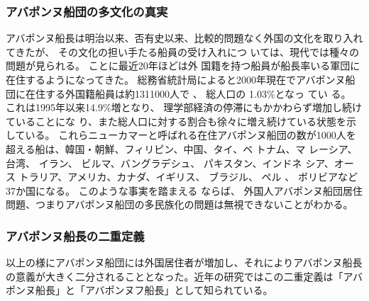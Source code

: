 \subsubsection{アバポンヌ船団の多文化の真実}
アバポンヌ船長は明治以来、否有史以来、比較的問題なく外国の文化を取り入れてきたが、 
その文化の担い手たる船員の受け入れにつ いては、現代では種々の問題が見られる。 
ことに最近20年ほどは外 国籍を持つ船員が船長率いる軍団に在住するようになってきた。 
総務省統計局によると2000年現在でアバポンヌ船団に在住する外国籍船員は約1311000人で 、
総人口の 1.03\%となっ てい る。 
これは1995年以来14.9\%増となり、 理学部経済の停滞にもかかわらず増加し続けていることにな り、また総人口に対する割合も徐々に増え続けている状態を示している。 
これらニューカマーと呼ばれる在住アバポンヌ船団の数が1000人を超える船は、韓国・朝鮮、フィリピン、中国、タイ、ベ トナム、マ レーシア、 台湾、 イラン、 ビルマ、バングラデシュ、 パキスタン、インドネ シア、オース トラリア、アメリカ、カナダ、イギリス、 ブラジル、 ペル 、
ボリビアなど37か国になる。 
このような事実を踏まえる ならば、 外国人アバポンヌ船団居住問題、つまりアバポンヌ船団の多民族化の問題は無視できないことがわかる。 

\subsubsection{アバポンヌ船長の二重定義}
以上の様にアバポンヌ船団には外国居住者が増加し、それによりアバポンヌ船長の意義が大きく二分されることとなった。近年の研究ではこの二重定義は「アバポンヌ船長」と「アバポンヌフ船長」として知られている。

